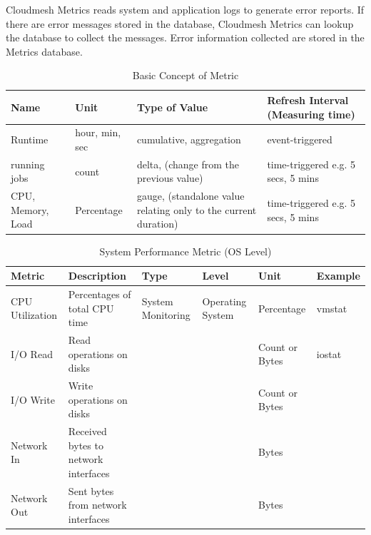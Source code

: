 \documentclass{sig-alternate-05-2015}
\begin{document}
Cloudmesh Metrics reads system and application logs to generate error
reports. If there are error messages stored in the database, Cloudmesh
Metrics can lookup the database to collect the messages. Error
information collected are stored in the Metrics database.


\begin{table}[htb]
\caption{Basic Concept of Metric}
\begin{scriptsize}
\label{T:BCmetrics}
\bigskip
\begin{center}
\begin{tabular}{p{}p{}p{}p{}}
Name & Unit & Type of Value & Refresh Interval (Measuring time) \\
\hline
Runtime &
hour, min, sec &
cumulative,
aggregation &
event-triggered \\
\hline 
running jobs &
count &
delta, 
(change from the previous value) &
time-triggered e.g. 5 secs, 5 mins\\
\hline
CPU, Memory, Load &
Percentage &
gauge,  
(standalone value relating only to the current duration) &
time-triggered e.g. 5 secs, 5 mins\\
\hline
\end{tabular}
\end{center}
\end{scriptsize}
\end{table}


\begin{table}[htb]

\caption{System Performance Metric (OS Level)}
\begin{scriptsize}
\label{T:SPmetrics}
\bigskip
\begin{center}
\begin{tabular}{p{}p{}p{}p{}p{}p{}}
Metric & Description & Type & Level & Unit & Example \\
\hline
CPU Utilization &
Percentages of total CPU time &
System Monitoring &
Operating System & 
Percentage & 
vmstat \\
\hline
I/O Read &
Read operations on disks &
&
&
Count or Bytes &
iostat \\
\hline
I/O Write &
Write operations on disks &
&
&
Count or Bytes  &
\\
\hline
Network In &
Received bytes to network interfaces &
&
&
Bytes &
\\
\hline
Network Out &
Sent bytes from network interfaces &
&
&
Bytes &
\\
\hline
\end{tabular}
\end{center}
\end{scriptsize}
\end{table}
\end{document}
